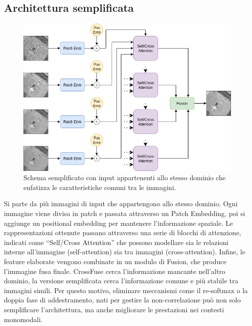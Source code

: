 \subsection{Architettura semplificata}
\begin{figure}[H]
  \centering
  \includegraphics[width=1.0\textwidth]{utils/schema.png}
  \caption{Schema semplificato con input appartenenti allo stesso dominio che enfatizza le caratteristiche comuni tra le immagini.} 
  \label{fig:schema}
\end{figure}
Si parte da più immagini di input che appartengono allo stesso dominio.
Ogni immagine viene divisa in patch e passata attraverso un Patch Embedding, poi si aggiunge un positional embedding per mantenere l’informazione spaziale.
Le rappresentazioni ottenute passano attraverso una serie di blocchi di attenzione, indicati come “Self/Cross Attention” che possono modellare sia le relazioni interne all’immagine (self-attention) sia tra immagini (cross-attention).
Infine, le feature elaborate vengono combinate in un modulo di Fusion, che produce l’immagine fusa finale.
CrossFuse cerca l’informazione mancante nell’altro dominio, la versione semplificata cerca l’informazione comune e più stabile tra immagini simili.
Per questo motivo, eliminare meccanismi come il re-softmax o la doppia fase di addestramento, nati per gestire la non-correlazione 
può non solo semplificare l’architettura, ma anche migliorare le prestazioni nei contesti monomodali.



 

